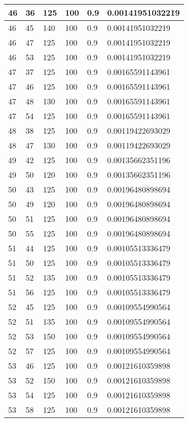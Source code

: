\begin{longtable}{|l|l|l|l|l|l|}
46 & 36 & 125 & 100 & 0.9 & 0.00141951032219 \\ \hline
46 & 45 & 140 & 100 & 0.9 & 0.00141951032219 \\ \hline
46 & 47 & 125 & 100 & 0.9 & 0.00141951032219 \\ \hline
46 & 53 & 125 & 100 & 0.9 & 0.00141951032219 \\ \hline
47 & 37 & 125 & 100 & 0.9 & 0.00165591143961 \\ \hline
47 & 46 & 125 & 100 & 0.9 & 0.00165591143961 \\ \hline
47 & 48 & 130 & 100 & 0.9 & 0.00165591143961 \\ \hline
47 & 54 & 125 & 100 & 0.9 & 0.00165591143961 \\ \hline
48 & 38 & 125 & 100 & 0.9 & 0.00119422693029 \\ \hline
48 & 47 & 130 & 100 & 0.9 & 0.00119422693029 \\ \hline
49 & 42 & 125 & 100 & 0.9 & 0.00135662351196 \\ \hline
49 & 50 & 120 & 100 & 0.9 & 0.00135662351196 \\ \hline
50 & 43 & 125 & 100 & 0.9 & 0.00196480898694 \\ \hline
50 & 49 & 120 & 100 & 0.9 & 0.00196480898694 \\ \hline
50 & 51 & 125 & 100 & 0.9 & 0.00196480898694 \\ \hline
50 & 55 & 125 & 100 & 0.9 & 0.00196480898694 \\ \hline
51 & 44 & 125 & 100 & 0.9 & 0.00105513336479 \\ \hline
51 & 50 & 125 & 100 & 0.9 & 0.00105513336479 \\ \hline
51 & 52 & 135 & 100 & 0.9 & 0.00105513336479 \\ \hline
51 & 56 & 125 & 100 & 0.9 & 0.00105513336479 \\ \hline
52 & 45 & 125 & 100 & 0.9 & 0.00109554990564 \\ \hline
52 & 51 & 135 & 100 & 0.9 & 0.00109554990564 \\ \hline
52 & 53 & 150 & 100 & 0.9 & 0.00109554990564 \\ \hline
52 & 57 & 125 & 100 & 0.9 & 0.00109554990564 \\ \hline
53 & 46 & 125 & 100 & 0.9 & 0.00121610359898 \\ \hline
53 & 52 & 150 & 100 & 0.9 & 0.00121610359898 \\ \hline
53 & 54 & 125 & 100 & 0.9 & 0.00121610359898 \\ \hline
53 & 58 & 125 & 100 & 0.9 & 0.00121610359898 \\ \hline

\end{longtable}
